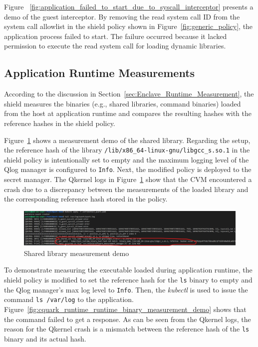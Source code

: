 Figure ~\ref{fig:application_failed_to_start_due_to_syscall_interceptor} presents a demo of the guest interceptor. By removing the read system call ID from the system call allowlist in the shield policy shown in Figure~\ref{fig:generic_policy}, 
the application process failed to start. The failure occurred because it lacked permission to execute the read system call for loading dynamic libraries.

\subsection{Application Runtime Measurements}
\label{sec:eva_qualitativ_runtime_meausre}
According to the discussion in Section~\ref{sec:Enclave_Runtime_Measurement}, the shield measures the binaries (e.g., shared libraries, command binaries) loaded from the host at application runtime and compares the resulting hashes with the reference hashes in the shield policy.  

Figure~\ref{fig:cquark_runtime_runtime_lib_measurement_demo} shows a measurement demo of the shared library. Regarding the setup, the reference hash of the library \texttt{/lib/x86\_64-linux-gnu/libgcc\_s.so.1} in the shield policy is intentionally set to empty and the maximum logging level of the Qlog manager is configured to \texttt{Info}. Next, 
the modified policy is deployed to the secret manager. The Qkernel logs in Figure~\ref{fig:cquark_runtime_runtime_lib_measurement_demo} show that the \acrshort{CVM} encountered a crash due to a discrepancy between the measurements of the loaded library and the corresponding reference hash stored in the policy.


\begin{figure}[!htb]
    \centering
    \includegraphics[width=1\textwidth]{images/cquark_runtime_runtime_lib_measurement_demo.png}
    \caption[Shared library measurement demo]{Shared library measurement demo}
    \label{fig:cquark_runtime_runtime_lib_measurement_demo}
\end{figure}


To demonstrate measuring the executable loaded during application runtime, the shield policy is modified to set the reference hash for the \texttt{ls} binary to empty and the Qlog manager's max log level to \texttt{Info}. Then, the \emph{kubectl} is used to 
issue the command \texttt{ls /var/log} to the application. Figure~\ref{fig:cquark_runtime_runtime_binary_measurement_demo} shows that the command failed to get a response. As can be seen from the Qkernel logs, the reason for the Qkernel crash is a mismatch between the 
reference hash of the \texttt{ls} binary and its actual hash.



